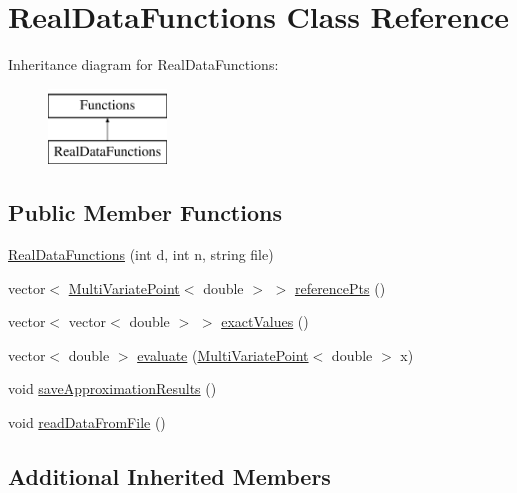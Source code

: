 \hypertarget{class_real_data_functions}{}\section{Real\+Data\+Functions Class Reference}
\label{class_real_data_functions}
Inheritance diagram for Real\+Data\+Functions\+:\begin{figure}[H]
\begin{center}
\leavevmode
\includegraphics[height=2.000000cm]{class_real_data_functions}
\end{center}
\end{figure}
\subsection*{Public Member Functions}
\begin{DoxyCompactItemize}
\item 
\hyperlink{class_real_data_functions_a8c284fd674bf306d2069e984c7ea6c13}{Real\+Data\+Functions} (int d, int n, string file)
\item 
vector$<$ \hyperlink{class_multi_variate_point}{Multi\+Variate\+Point}$<$ double $>$ $>$ \hyperlink{class_real_data_functions_a9f25dd7676fe94730988fd244b71a158}{reference\+Pts} ()
\item 
vector$<$ vector$<$ double $>$ $>$ \hyperlink{class_real_data_functions_a0ff7f83b273d83d42053a1ce366d8637}{exact\+Values} ()
\item 
vector$<$ double $>$ \hyperlink{class_real_data_functions_a359a4965873b56bea2e19287b15ae585}{evaluate} (\hyperlink{class_multi_variate_point}{Multi\+Variate\+Point}$<$ double $>$ x)
\item 
void \hyperlink{class_real_data_functions_a84d811e14eca8b9f4d752cb1b3c700d9}{save\+Approximation\+Results} ()
\item 
void \hyperlink{class_real_data_functions_a0095f9185d37621decc568db26c7926c}{read\+Data\+From\+File} ()
\end{DoxyCompactItemize}
\subsection*{Additional Inherited Members}


